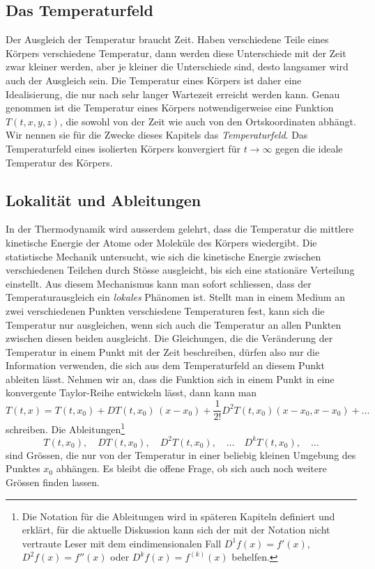 \subsection{Das Temperaturfeld}
Der Ausgleich der Temperatur braucht Zeit.
Haben verschiedene Teile eines Körpers verschiedene Temperatur, dann
werden diese Unterschiede mit der Zeit zwar kleiner werden, aber je
kleiner die Unterschiede sind, desto langsamer wird auch der Ausgleich sein.
Die Temperatur eines Körpers ist daher eine Idealisierung, die nur
nach sehr langer Wartezeit erreicht werden kann.
Genau genommen ist die Temperatur eines Körpers notwendigerweise eine
Funktion $T(t,x,y,z)$, die sowohl von der Zeit wie auch von den
Ortskoordinaten abhängt.
Wir nennen sie für die Zwecke dieses Kapitels das {\em Temperaturfeld}.
%
Das Temperaturfeld eines isolierten Körpers konvergiert für
$t\to\infty$ gegen die ideale Temperatur des Körpers.

%
%
\subsection{Lokalität und Ableitungen}
In der Thermodynamik wird ausserdem gelehrt, dass die Temperatur die
%
mittlere kinetische Energie der Atome oder Moleküle des Körpers wiedergibt.
Die statistische Mechanik untersucht, wie sich die kinetische Energie
zwischen verschiedenen Teilchen durch Stösse ausgleicht, bis sich eine
stationäre Verteilung einstellt.
Aus diesem Mechanismus kann man sofort schliessen, dass der
Temperaturausgleich ein {\em lokales} Phänomen ist.
%
Stellt man in einem Medium an zwei verschiedenen Punkten verschiedene
Temperaturen fest, kann sich die Temperatur nur ausgleichen, wenn
sich auch die Temperatur an allen Punkten zwischen diesen beiden
ausgleicht.
Die Gleichungen, die die Veränderung der Temperatur in einem Punkt
mit der Zeit beschreiben, dürfen also nur die Information verwenden,
die sich aus dem Temperaturfeld an diesem Punkt ableiten lässt.
Nehmen wir an, dass die Funktion sich in einem Punkt in eine konvergente
Taylor-Reihe entwickeln lässt, dann kann man
%
\[
T(t,x)
=
T(t,x_0) + DT(t,x_0)\, (x-x_0) + \frac{1}{2!} D^2T(t,x_0)(x-x_0,x-x_0) + \dots
\]
schreiben.
Die Ableitungen\footnote{Die Notation für die Ableitungen wird
in späteren Kapiteln definiert und erklärt, für die aktuelle Diskussion
kann sich der mit der Notation nicht vertraute Leser mit dem eindimensionalen
Fall $D^1f(x) = f'(x)$, $D^2f(x) = f''(x)$ oder $D^kf(x)=f^{(k)}(x)$ behelfen.}
\[
T(t,x_0), \quad
DT(t,x_0), \quad
D^2T(t,x_0),\quad \dots\quad
D^kT(t,x_0),\quad\dots
\]
sind Grössen, die nur von der Temperatur in einer beliebig kleinen
Umgebung des Punktes $x_0$ abhängen.
Es bleibt die offene Frage, ob sich auch noch weitere Grössen finden lassen.

